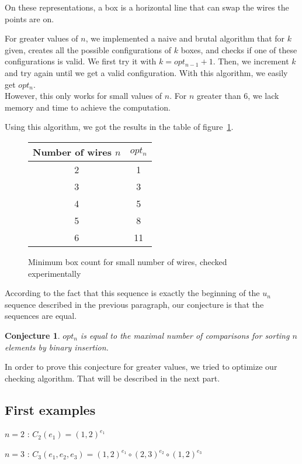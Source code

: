 \documentclass[11pt, a4paper]{article}
\newtheorem*{Conj*}{Conjecture}
\begin{document}
On these representations, a box is a horizontal line that can swap the wires the points are on.

For greater values of $n$, we implemented a naive and brutal algorithm that for
$k$ given, creates all the possible configurations of $k$ boxes, and checks if
one of these configurations is valid. We first try it with $k = opt_{n-1}+1$. Then,
we increment $k$ and try again until we get a valid configuration.  With this
algorithm, we easily get $opt_n$.\\
However, this only works for small values of $n$. For $n$ greater than 6, we
lack memory and time to achieve the computation.

Using this algorithm, we got the results in the table of figure~\ref{box-count}.

\begin{figure}
    \centering
    \begin{tabular}{|c|c|}
    \hline
    Number of wires $n$ & $opt_n$ \\
    \hline
    2 & 1 \\
    3 & 3 \\
    4 & 5 \\
    5 & 8 \\
    6 & 11 \\
    \hline
    \end{tabular}
    \caption{Minimum box count for small number of wires, checked experimentally}
    \label{box-count}
\end{figure}

According to the fact that this sequence is exactly the beginning of the $u_n$
sequence described in the previous paragraph, our conjecture is that the
sequences are equal.

\begin{Conj*}
$opt_n$ is equal to the maximal number of comparisons for sorting $n$ elements
by binary insertion.
\end{Conj*}


In order to prove this conjecture for greater values, we tried to optimize our
checking algorithm. That will be described in the next part.

\subsection{First examples}

$n=2$ : $C_2(e_1) = (1,2)^{e_1}$

$n=3$ : $C_3(e_1,e_2,e_3) = (1,2)^{e_1} \circ (2,3)^{e_2} \circ (1,2)^{e_3}$
\end{document}
